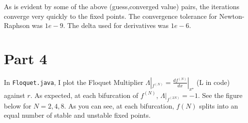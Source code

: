 \documentclass[aps,letterpaper,10pt]{article}
\newcommand{\ttt}{\texttt}
\begin{document}
As is evident by some of the above (guess,converged value) pairs, the iterations converge very quickly to the fixed points. The convergence tolerance for Newton-Raphson was $1e-9$. The delta used for derivatives was $1e-6$.

\section{Part 4}

In \ttt{Floquet.java}, I plot the Floquet Multiplier $\Lambda|_{f^{(N)}} = \frac{df^{(N)}}{dx}|_{x^\star}$ (L in code) against $r$. As expected, at each bifurcation of $f^{(N)}$, $\Lambda|_{f^{(2N)}}=-1$. See the figure below for $N=2,4,8$. As you can see, at each bifurcation, $f(N)$ splits into an equal number of stable and unstable fixed points.
\newpage
\end{document}
